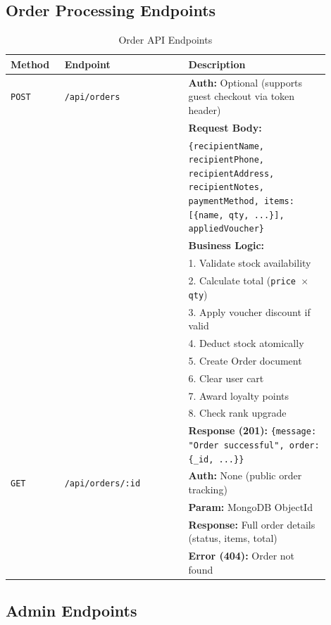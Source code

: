 \documentclass[12pt, a4paper]{report}
\begin{document}
\subsection{Order Processing Endpoints}

\begin{table}[H]
\centering
\caption{Order API Endpoints}
\label{tab:api_orders}
\small
\begin{tabular}{@{}p{0.15\linewidth}p{0.35\linewidth}p{0.40\linewidth}@{}}
\toprule
\textbf{Method} & \textbf{Endpoint} & \textbf{Description} \\
\midrule
\texttt{POST} & \texttt{/api/orders} & 
\textbf{Auth:} Optional (supports guest checkout via token header) \\
& & \textbf{Request Body:} \\
& & \texttt{\{recipientName, recipientPhone, recipientAddress, recipientNotes, paymentMethod, items: [\{name, qty, ...\}], appliedVoucher\}} \\
& & \textbf{Business Logic:} \\
& & 1. Validate stock availability \\
& & 2. Calculate total (\texttt{price $\times$ qty}) \\
& & 3. Apply voucher discount if valid \\
& & 4. Deduct stock atomically \\
& & 5. Create Order document \\
& & 6. Clear user cart \\
& & 7. Award loyalty points \\
& & 8. Check rank upgrade \\
& & \textbf{Response (201):} \texttt{\{message: "Order successful", order: \{\_id, ...\}\}} \\
\midrule
\texttt{GET} & \texttt{/api/orders/:id} & 
\textbf{Auth:} None (public order tracking) \\
& & \textbf{Param:} MongoDB ObjectId \\
& & \textbf{Response:} Full order details (status, items, total) \\
& & \textbf{Error (404):} Order not found \\
\bottomrule
\end{tabular}
\end{table}

\subsection{Admin Endpoints}
\end{document}
